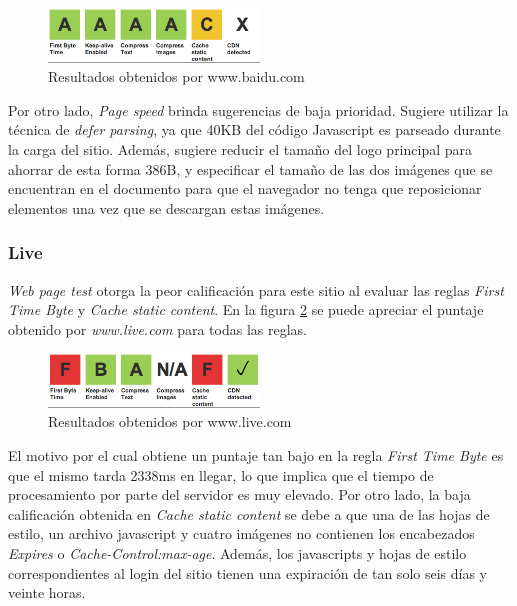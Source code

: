 \begin{figure}[h]
\centering
\includegraphics[width=0.5\textwidth]{figuras/lado_cliente/baidu/page_results.png}
  \caption{Resultados obtenidos por www.baidu.com}
    \label{fig.baidu_page_results}
\end{figure}

Por otro lado, \emph{Page speed} brinda sugerencias de baja prioridad. Sugiere utilizar la técnica de \emph{defer parsing}, ya que 40KB del código Javascript es parseado
durante la carga del sitio. Además, sugiere reducir el tamaño del logo principal para ahorrar de esta forma 386B, y especificar el tamaño de las dos imágenes que se
encuentran en el documento para que el navegador no tenga que reposicionar elementos una vez que se descargan estas imágenes.

\subsubsection{Live}

\emph{Web page test} otorga la peor calificación para este sitio al evaluar las reglas \emph{First Time Byte} y \emph{Cache static content}. En la figura \ref{fig.live_page_results}
se puede apreciar el puntaje obtenido por \emph{www.live.com} para todas las reglas.

\begin{figure}[h]
\centering
\includegraphics[width=0.5\textwidth]{figuras/lado_cliente/live/page_results.png}
  \caption{Resultados obtenidos por www.live.com}
    \label{fig.live_page_results}
\end{figure}

El motivo por el cual obtiene un puntaje tan bajo en la regla \emph{First Time Byte} es que el mismo tarda 2338ms en llegar, lo que implica que el tiempo de procesamiento
por parte del servidor es muy elevado. Por otro lado, la baja calificación obtenida en \emph{Cache static content} se debe a que una de las hojas de estilo, un archivo javascript
y cuatro imágenes no contienen los encabezados \emph{Expires} o \emph{Cache-Control:max-age}. Además, los javascripts y hojas de estilo correspondientes al login del sitio tienen una expiración de tan solo seis días y veinte horas.

